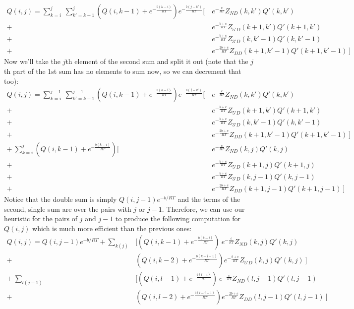\begin{equation}
\begin{split}
Q(i, j) = \sum_{k= i}^j\ \sum_{k' = k + 1}^j \left (  Q(i, k-1) + e^{-\frac{b(k-i)}{RT}} \right ) e^{-\frac{b(j - k')}{RT} } \bigg [ \ 
  & e^{-\frac{c}{RT} }Z_{ND}(k, k') Q'(k, k')  \\
+\  & e^{-\frac{b + c}{RT}}Z_{5'D}(k + 1, k')Q'(k + 1, k') \\ 
+\ & e^{-\frac{b + c}{RT}}Z_{3'D}(k, k'-1)Q'(k, k' - 1) \\
+\  & e^{-\frac{2b + c}{RT}}Z_{DD}(k + 1, k'-1)Q'(k + 1, k'-1) \   \bigg ]
\end{split}
\end{equation}
\noindent
Now we'll take the $j$th element of the second sum and split it out (note that the $j$th part of the 1st sum has no elements to sum now, so we can decrement that too):
\begin{equation}
\begin{split}
Q(i, j) = \sum_{k= i}^{j-1}\ \sum_{k' = k + 1}^{j-1} \left (  Q(i, k-1) + e^{-\frac{b(k-i)}{RT}} \right ) e^{-\frac{b(j - k')}{RT} } \bigg [ \ 
  & e^{-\frac{c}{RT} }Z_{ND}(k, k') Q'(k, k')  \\
+ \  & e^{-\frac{b + c}{RT}}Z_{5'D}(k + 1, k')Q'(k + 1, k')\\ 
+\   & e^{-\frac{b + c}{RT}}Z_{3'D}(k, k'-1)Q'(k, k' - 1) \\
+\  & e^{-\frac{2b + c}{RT}}Z_{DD}(k + 1, k'-1)Q'(k + 1, k'-1) \   \bigg ] \\
+\ \sum_{k=i}^j  \left (  Q(i, k-1) + e^{-\frac{b(k-i)}{RT}} \right ) \bigg [ \ 
  & e^{-\frac{c}{RT} }Z_{ND}(k, j) Q'(k, j) \\
+\  & e^{-\frac{b + c}{RT}}Z_{5'D}(k + 1, j)Q'(k + 1, j) \\ 
+\  & e^{-\frac{b + c}{RT}}Z_{3'D}(k, j-1)Q'(k, j - 1) \\
 +\  & e^{-\frac{2b + c}{RT}}Z_{DD}(k + 1, j-1)Q'(k + 1, j-1) \   \bigg ]
\end{split}
\end{equation}
\noindent
Notice that the double sum is simply $Q(i,j-1)e^{-b/RT}$ and the terms of the second, single sum are over the pairs with $j$ or $j-1$. Therefore, we can use our heuristic for the pairs of $j$ and $j-1$ to produce the following computation for $Q(i, j)$ which is much more efficient than the previous ones:
\begin{equation}
\begin{split}
Q(i,j) = Q(i, j-1)e^{-b/RT} +  \sum_{k(j)} & \bigg [  \left (  Q(i, k-1) + e^{-\frac{b(k-i)}{RT}} \right ) \
   e^{-\frac{c}{RT} }Z_{ND}(k, j) Q'(k, j)  \\
+\ & \left (  Q(i, k-2) + e^{-\frac{b(k-i-1)}{RT}} \right )    e^{-\frac{b + c}{RT}}Z_{5'D}(k, j)Q'(k, j) \   \bigg ]  \\
+\  \sum_{l(j-1)} & \bigg [  \left (  Q(i, l-1) + e^{-\frac{b(l-i)}{RT}} \right ) \
   e^{-\frac{c}{RT} }Z_{ND}(l, j-1) Q'(l, j-1)  \\
+\ & \left (  Q(i, l-2) + e^{-\frac{b(l-i-1)}{RT}} \right )   e^{-\frac{2b + c}{RT}}Z_{DD}(l, j-1)Q'(l, j-1) \   \bigg ] 
\end{split}
\end{equation}

